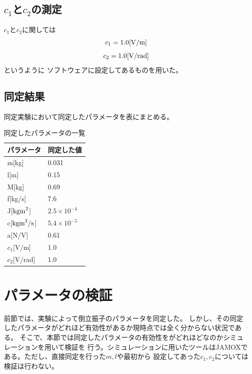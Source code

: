 \subsection{$c_1$と$c_2$の測定}
	$c_1$と$c_2$に関しては
	\[
		c_1 = 1.0 [\rm{V/m}]
	\]
	\[
		c_2 = 1.0[\rm{V/rad}]
	\]
	というように
	ソフトウェアに設定してあるものを用いた。
\subsection{同定結果}
	同定実験において同定したパラメータを表にまとめる。
	\begin{table}[htb]
		\begin{center}
			\caption{同定したパラメータの一覧}
			\medskip
			
			\begin{tabular}{|l|l|}\hline
				パラメータ & 同定した値 \\ \hline\hline
				m[kg]  & 0.031\\ \hline
				l[m] & 0.15\\ \hline
				M[kg] & 0.69\\ \hline
				f[kg/s] & 7.6\\ \hline
				J[$\rm{kgm}^2$] & $2.5\times10^{-4}$\\ \hline
				c[$\rm{kgm}^2/\rm{s}$] & $5.4\times10^{-5}$\\ \hline
				a[N/V] & 0.61\\ \hline
				$c_{1}$[V/m] & 1.0\\ \hline
				$c_{2}$[V/rad] & 1.0\\ \hline
			\end{tabular}
		\end{center}
	\end{table}
\section{パラメータの検証}
	前節では、実験によって倒立振子のパラメータを同定した。
	しかし、その同定したパラメータがどれほど有効性があるか現時点では全く分からない状況である。
	そこで、本節では同定したパラメータの有効性をがどれほどなのかシミュレーションを用いて検証を
	行う。シミュレーションに用いたツールはJAMOXである。ただし、直接同定を行った$m,l$や最初から
	設定してあった$c_1,c_2$については検証は行わない。

